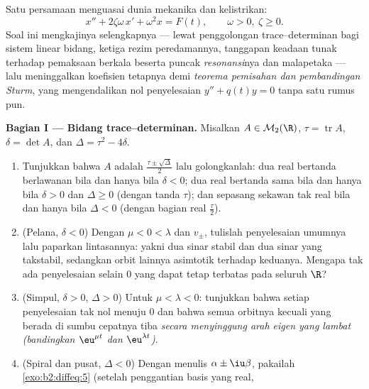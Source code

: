 \begin{problem}\label{pb:b2:diffeq:1}
Satu persamaan menguasai dunia mekanika dan kelistrikan:
\[
x'' + 2\zeta\omega\,x' + \omega^2 x = F(t),
\qquad \omega > 0,\ \zeta \geq 0 .
\]
Soal ini mengkajinya selengkapnya --- lewat penggolongan
trace--determinan bagi sistem linear bidang,
ketiga rezim peredamannya, tanggapan keadaan tunak terhadap
pemaksaan berkala beserta puncak \emph{resonansi}nya
dan malapetaka  --- lalu meninggalkan koefisien
tetapnya demi \emph{teorema pemisahan dan pembandingan
Sturm}, yang mengendalikan
nol penyelesaian $y'' + q(t)y = 0$ tanpa satu rumus pun.

\medskip
\noindent\textbf{Bagian I --- Bidang trace--determinan.} Misalkan
$A \in \mathcal M_2(\R)$, $\tau = \operatorname{tr}A$, $\delta
= \det A$, dan $\Delta = \tau^2 - 4\delta$.
\begin{enumerate}
  \item Tunjukkan bahwa  $A$ adalah
        $\frac{\tau\pm\sqrt\Delta}{2}$ lalu golongkanlah: dua  real bertanda berlawanan bila dan hanya bila $\delta < 0$; dua  real bertanda sama bila dan hanya bila $\delta > 0$ dan $\Delta
        \geq 0$ (dengan tanda $\tau$); dan sepasang sekawan tak real bila dan hanya bila
        $\Delta < 0$ (dengan bagian real $\frac\tau2$).
  \item (Pelana, $\delta < 0$) Dengan  $\mu < 0 <
        \lambda$ dan  $v_\pm$, tulislah penyelesaian
        umumnya lalu paparkan lintasannya: yakni dua sinar stabil dan
        dua sinar yang takstabil, sedangkan orbit lainnya asimtotik terhadap
        keduanya. Mengapa tak ada penyelesaian selain $0$ yang dapat tetap terbatas pada seluruh
        $\R$?
  \item (Simpul, $\delta > 0$, $\Delta > 0$) Untuk $\mu < \lambda
        < 0$: tunjukkan bahwa setiap penyelesaian tak nol menuju $0$ dan
        bahwa semua orbitnya kecuali yang berada di sumbu cepatnya tiba
        \emph{secara menyinggung arah eigen yang lambat}
        \emph{(bandingkan $\eu^{\mu t}$ dan $\eu^{\lambda t}$)}.
  \item (Spiral dan pusat, $\Delta < 0$) Dengan menulis
         $\alpha \pm \iu\beta$, pakailah
        \cref{exo:b2:diffeq:5} (setelah penggantian basis yang real,

\end{enumerate}
\end{problem}
